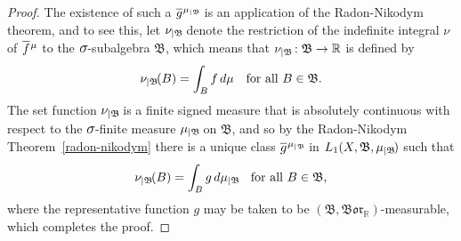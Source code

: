 \documentclass[
twoside=true,
paper=letter,
fontsize=11pt,
pagesize=auto,
leqno,
openany,
headsepline,
overfullrule,
]{scrbook}
\theoremstyle{plain}
\theoremstyle{plain}
\theoremstyle{definition}
\theoremstyle{bfnoteitalic}
\theoremstyle{bfnoteroman}
\newcommand{\sigalg}[1]{\mathfrak{#1}}
\newcommand{\borel}{\mathfrak{Bor}}
\newcommand{\textsigma}{\hbox{\large{$\sigma$}}\kern-1pt}
\newcommand{\restrictedto}[1]{_{\lvert#1}\kern-1.5pt}
\newcommand{\R}{\mathbb{R}}
\newcommand{\sigmaalgebraii}{\sigalg{B}}
\newcommand{\function}{f}
\newcommand{\functionii}{g}
\newcommand{\measurespace}{X}
\newcommand{\measure}{\mu}
\newcommand{\measureii}{\nu}
\newcommand*\xbar[1]{%
   \hbox{%
     \vbox{%
       \hrule height 0.4pt %
       \kern0.4ex%
       \hbox{%
         \ensuremath{#1}%
       }%
     }%
   }%
}
\newcommand{\lebclass}[1]{\hspace{.5pt}\xbar{#1}\hspace{0.5pt}}
\newcommand{\ellclass}[2]{\lebclass{#1}^{#2}}
\begin{document}
\begin{proof}
The existence of such a  $\ellclass{\functionii}{\measure\restrictedto{\sigmaalgebraii}}$ is an application of the Radon-Nikodym theorem, and to see this, let $\measureii\restrictedto{\sigmaalgebraii}$ denote the restriction of the indefinite integral $\measureii$ of $\ellclass{\function}{\measure}$ to the $\textsigma$-subalgebra $\sigmaalgebraii$, which means that $\measureii\restrictedto{\sigmaalgebraii} :\sigmaalgebraii\to\R$ is defined by
\[
\measureii\restrictedto{\sigmaalgebraii}(B) 
=
\int_B \function\, d\measure
\quad\text{for all $B\in\sigmaalgebraii$.}
\]
The set function $\measureii\restrictedto{\sigmaalgebraii}$ is a finite signed measure that is absolutely continuous with respect to the $\textsigma$-finite measure $\measure\restrictedto{\sigmaalgebraii}$ on $\sigmaalgebraii$, and so by the Radon-Nikodym Theorem~\ref{radon-nikodym} there is a unique class
$\ellclass{\functionii}{\measure\restrictedto{\sigmaalgebraii}}$ in $L_1(\measurespace, \sigmaalgebraii,\measure\restrictedto{\sigmaalgebraii})$ 
such that
\[
\measureii\restrictedto{\sigmaalgebraii}(B) 
= 
\int_B \functionii \, d\measure\restrictedto{\sigmaalgebraii}
\quad\text{for all $B\in\sigmaalgebraii$,}
\]
where the representative function $\functionii$ may be taken to be $(\sigmaalgebraii, \borel_\R)$\hyp{}measurable,
which completes the proof.
\end{proof}  
\end{document}
